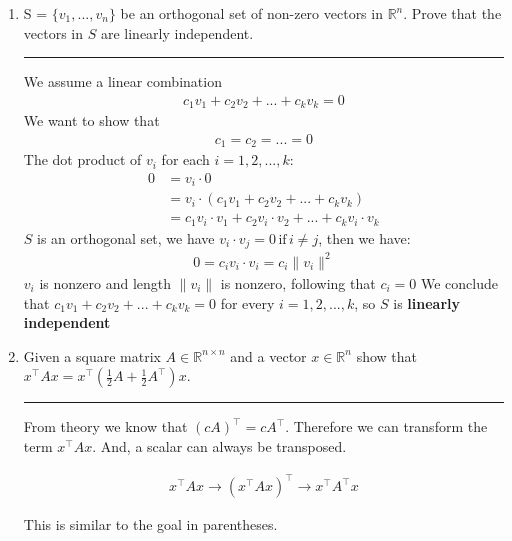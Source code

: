 \documentclass[12pt]{article}
\begin{document}
\begin{enumerate}
    \item S = $\{v_1, ... , v_n\}$ be an orthogonal set of non-zero vectors in $\mathbb{R}^n$. Prove that the vectors in $S$ are linearly independent.

    \noindent\rule{\linewidth}{1pt}

    We assume a linear combination
    \begin{align*} 
        c_1 v_1 + c_2 v_2 + ... + c_k v_k = 0
    \end{align*}
    We want to show that
    \begin{align*} 
        c_1 = c_2 = ... = 0
    \end{align*}
    The dot product of $v_i$ for each $ i = 1,2, ... , k $:
    \begin{align*} 
        0 &= v_i \cdot 0 \\
          &= v_i \cdot (c_1 v_1 + c_2 v_2 + ... + c_k v_k) \\
          &= c_1 v_i \cdot v_1 + c_2 v_i \cdot v_2 + ... + c_k v_i \cdot v_k
    \end{align*}
    $S$ is an orthogonal set, we have $v_i \cdot v_j = 0 \, \textrm{if} \, i \neq j $, then we have:
    \begin{align*} 
        0 = c_i v_i \cdot v_i = c_i \|v_i\|^2
    \end{align*}
    $v_i$ is nonzero and length $\|v_i\|$ is nonzero, following that $c_i = 0$ \newline
    We conclude that $c_1 v_1 + c_2 v_2 + ... + c_k v_k = 0$ for every $ i = 1,2, ... , k $, so $S$ is \textbf{linearly independent}

    \item Given a square matrix $A \in \mathbb{R}^{n \times n}$ and a vector $x \in \mathbb{R}^n$ show that $x^\intercal Ax = x^\intercal ( \frac{1}{2} A + \frac{1}{2} A^\intercal )x$.
    
    \noindent\rule{\linewidth}{1pt}

    From theory we know that $(cA)^\intercal = cA^\intercal$. Therefore we can transform the term $x^\intercal Ax$. And, a scalar can always be transposed.

    \begin{align*}
        x^\intercal Ax \rightarrow (x^\intercal Ax)^\intercal \rightarrow x^\intercal A^\intercal x
    \end{align*}

    This is similar to the goal in parentheses.


\end{enumerate}
\end{document}
